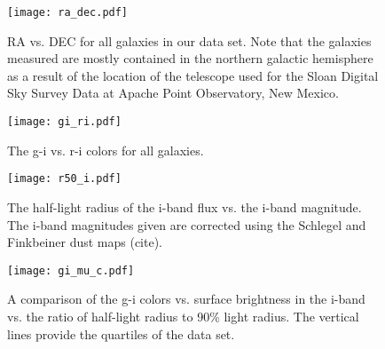 \documentclass[12pt,preprint,pdftex]{aastex}
\begin{document}
\begin{figure}
\centering
\texttt{[image: ra\_dec.pdf]}
\caption{RA vs. DEC for all galaxies in our data set. Note that the galaxies measured are mostly contained in the northern galactic hemisphere as a result of the location of the telescope used for the Sloan Digital Sky Survey Data at Apache Point Observatory, New Mexico.}
\end{figure}

\begin{figure}
\centering
\texttt{[image: gi\_ri.pdf]}
\caption{The g-i vs. r-i colors for all galaxies.}
\end{figure}


\begin{figure}
\centering
\texttt{[image: r50\_i.pdf]}
\caption{The half-light radius of the i-band flux vs. the i-band magnitude. The i-band magnitudes given are corrected using the Schlegel and Finkbeiner dust maps (cite).}
\end{figure}

\begin{figure}
\centering
\texttt{[image: gi\_mu\_c.pdf]}
\caption{A comparison of the g-i colors vs. surface brightness in the i-band vs. the ratio of half-light radius to 90\% light radius. The vertical lines provide the quartiles of the data set.}
\end{figure}
\end{document}
